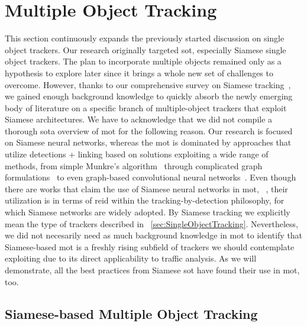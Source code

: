 \section{Multiple Object Tracking}
\label{sec:MultipleObjectTracking}

This section continuously expands the previously started discussion on single object trackers. Our research originally targeted \gls{sot}, especially Siamese single object trackers. The plan to incorporate multiple objects remained only as a hypothesis to explore later since it brings a whole new set of challenges to overcome. However, thanks to our comprehensive survey on Siamese tracking~\cite{ondrasovic2021siamese}, we gained enough background knowledge to quickly absorb the newly emerging body of literature on a specific branch of multiple-object trackers that exploit Siamese architectures. We have to acknowledge that we did not compile a thorough \gls{sota} overview of \gls{mot} for the following reason. Our research is focused on Siamese neural networks, whereas the \gls{mot} is dominated by approaches that utilize detections + linking based on solutions exploiting a wide range of methods, from simple Munkre's algorithm~\cite{munkres1957assignment} through complicated graph formulations~\cite{chen2001motdynamicgraph} to even graph-based convolutional neural networks~\cite{papakis2021gcnnmatch}. Even though there are works that claim the use of Siamese neural networks in \gls{mot}, \egtext{}~\cite{cuan2018deepsiammot}, their utilization is in terms of \gls{reid} within the tracking-by-detection philosophy, for which Siamese networks are widely adopted. By Siamese tracking we explicitly mean the type of trackers described in \sectiontext{}~\ref{sec:SingleObjectTracking}. Nevertheless, we did not necesarily need as much background knowledge in \gls{mot} to identify that Siamese-based \gls{mot} is a freshly rising subfield of trackers we should contemplate exploiting due to its direct applicability to traffic analysis. As we will demonstrate, all the best practices from Siamese \gls{sot} have found their use in \gls{mot}, too.

\subsection{Siamese-based Multiple Object Tracking}
\label{ssec:SiameseBasedMultipleObjectTracking}

